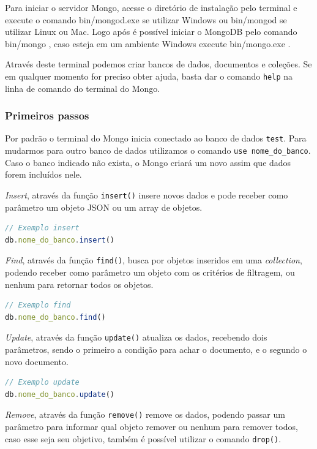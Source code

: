 \documentclass[
	12pt,				%
	openright,			%
	twoside,			%
	a4paper,			%
	english,			%
	brazil				%
	]{abntex2}
\begin{document}
Para iniciar o servidor Mongo, acesse o diretório de instalação pelo terminal e execute o comando bin/mongod.exe se utilizar Windows ou bin/mongod se utilizar Linux ou Mac. Logo após é possível iniciar o MongoDB pelo comando bin/mongo , caso esteja em um ambiente Windows execute bin/mongo.exe .

Através deste terminal podemos criar bancos de dados, documentos e coleções. Se em qualquer momento for preciso obter ajuda, basta dar o comando \verb|help| na linha de comando do terminal do Mongo.

\subsubsection{Primeiros passos}

Por padrão o terminal do Mongo inicia conectado ao banco de dados \verb|test|. Para mudarmos para outro banco de dados utilizamos o comando \verb|use nome_do_banco|. Caso o banco indicado não exista, o Mongo criará um novo assim que dados forem incluídos nele.

\textit{Insert}, através da função \verb|insert()| insere novos dados e pode receber como parâmetro um objeto JSON ou um array de objetos.

\begin{lstlisting}[language=javascript]
// Exemplo insert
db.nome_do_banco.insert()
\end{lstlisting}

\textit{Find}, através da função \verb|find()|, busca por objetos inseridos em uma \textit{collection}, podendo receber como parâmetro um objeto com os critérios de filtragem, ou nenhum para retornar todos os objetos.
 
\begin{lstlisting}[language=javascript]
// Exemplo find
db.nome_do_banco.find()
\end{lstlisting}

\textit{Update}, através da função \verb|update()| atualiza os dados, recebendo dois parâmetros, sendo o primeiro a condição para achar o documento, e o segundo o novo documento.

\begin{lstlisting}[language=javascript]
// Exemplo update
db.nome_do_banco.update()
\end{lstlisting}

\textit{Remove}, através da função \verb|remove()| remove os dados, podendo passar um parâmetro para informar qual objeto remover ou nenhum para remover todos, caso esse seja seu objetivo, também é possível utilizar o comando \verb|drop()|.
\end{document}
